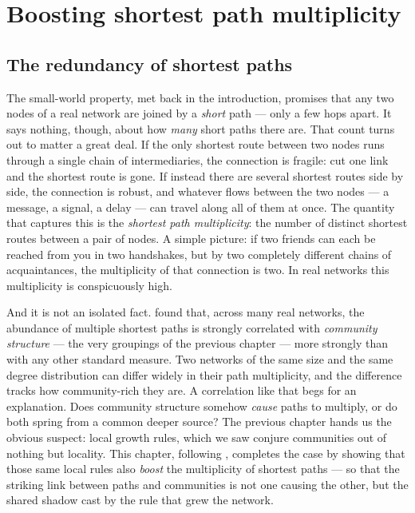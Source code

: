 \chapter{Boosting shortest path multiplicity}
\label{ch:distance}

\section{The redundancy of shortest paths}

The small-world property, met back in the introduction, promises that any two
nodes of a real network are joined by a \emph{short} path --- only a few hops
apart. It says nothing, though, about how \emph{many} short paths there are.
That count turns out to matter a great deal. If the only shortest route between
two nodes runs through a single chain of intermediaries, the connection is
fragile: cut one link and the shortest route is gone. If instead there are
several shortest routes side by side, the connection is robust, and whatever
flows between the two nodes --- a message, a signal, a delay --- can travel along
all of them at once. The quantity that captures this is the \emph{shortest path
multiplicity}: the number of distinct shortest routes between a pair of nodes. A
simple picture: if two friends can each be reached from you in two handshakes,
but by two completely different chains of acquaintances, the multiplicity of that
connection is two. In real networks this multiplicity is conspicuously high.

And it is not an isolated fact. \citet{deng2026} found that, across many real
networks, the abundance of multiple shortest paths is strongly correlated with
\emph{community structure} --- the very groupings of the previous chapter ---
more strongly than with any other standard measure. Two networks of the same size
and the same degree distribution can differ widely in their path multiplicity,
and the difference tracks how community-rich they are. A correlation like that
begs for an explanation. Does community structure somehow \emph{cause} paths to
multiply, or do both spring from a common deeper source? The previous chapter
hands us the obvious suspect: local growth rules, which we saw conjure
communities out of nothing but locality. This chapter, following
\citet{vazquezpaths2026}, completes the case by showing that those same local
rules also \emph{boost} the multiplicity of shortest paths --- so that the
striking link between paths and communities is not one causing the other, but the
shared shadow cast by the rule that grew the network.

